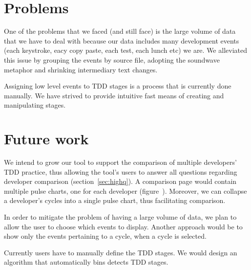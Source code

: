 \documentclass[journal]{vgtc}                %
\begin{document}

\section{Problems}

One of the problems that we faced (and still face) is the large volume of data that we have to deal with because our data includes many development events (each keystroke, eacy copy paste, each test, each lunch etc) we are.
We alleviated this issue by grouping the events by source file, adopting the soundwave metaphor and shrinking intermediary text changes.

Assigning low level events to TDD stages is a process that is currently done manually.
We have strived to provide intuitive fast means of creating and manipulating stages.

\section{Future work}

We intend to grow our tool to support the comparison of multiple developers' TDD practice, thus allowing the tool's users to answer all questions regarding developer comparison (section~\ref{sec:highq}).
A comparison page would contain multiple pulse charts, one for each developer (figure~).
Moreover, we can collapse a developer's cycles into a single pulse chart, thus facilitating comparison.


In order to mitigate the problem of having a large volume of data, we plan to allow the user to choose which events to display.
Another approach would be to show only the events pertaining to a cycle, when a cycle is selected.

Currently users have to manually define the TDD stages.
We would design an algorithm that automatically bins detects TDD stages.
 



\end{document}
